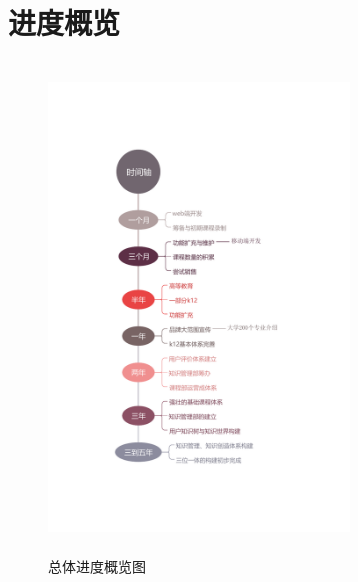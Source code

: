 \section{进度概览}
\begin{figure}[H]
	\centering
	\includegraphics[width=8cm,height=13cm]{figures/jdb2}
	\caption{总体进度概览图}
	\label{fg:jdb2}
\end{figure}